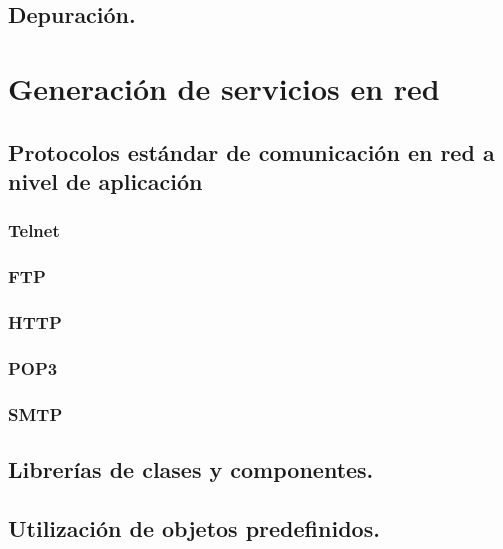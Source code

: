 \documentclass[a4paper,12pt,spanish]{sphinxmanual}
\begin{document}
\section{Depuración.}
\label{textos/tema3:depuracion}

\chapter{Generación de servicios en red}
\label{textos/tema4::doc}\label{textos/tema4:generacion-de-servicios-en-red}

\section{Protocolos estándar de comunicación en red a nivel de aplicación}
\label{textos/tema4:protocolos-estandar-de-comunicacion-en-red-a-nivel-de-aplicacion}

\subsection{Telnet}
\label{textos/tema4:telnet}

\subsection{FTP}
\label{textos/tema4:ftp}

\subsection{HTTP}
\label{textos/tema4:http}

\subsection{POP3}
\label{textos/tema4:pop3}

\subsection{SMTP}
\label{textos/tema4:smtp}

\section{Librerías de clases y componentes.}
\label{textos/tema4:librerias-de-clases-y-componentes}

\section{Utilización de objetos predefinidos.}
\label{textos/tema4:utilizacion-de-objetos-predefinidos}
\end{document}
